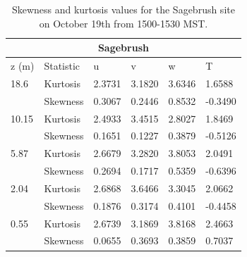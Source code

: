 \documentclass[]{article}
\begin{document}
\begin{table}
\begin{tabular}{ |p{1cm}|p{2cm}|p{1cm}|p{1cm}|p{1cm}| p{1.5cm}|}

		\hline
		\multicolumn{6}{|c|}{Sagebrush} \\
		\hline\hline
		z (m) & Statistic & u &  v & w & T\\
		\hline
		18.6 & Kurtosis & 2.3731 & 3.1820 & 3.6346&  1.6588\\
		&Skewness & 0.3067 & 0.2446 & 0.8532 & -0.3490\\
		\hline
		10.15 & Kurtosis & 2.4933 & 3.4515 & 2.8027 &1.8469 \\
		&Skewness & 0.1651 & 0.1227 & 0.3879& -0.5126\\
        \hline
       	5.87 & Kurtosis & 2.6679 & 3.2820 & 3.8053 &2.0491 \\
       	&Skewness & 0.2694 & 0.1717 & 0.5359 & -0.6396\\
       	\hline
   		2.04 & Kurtosis & \cellcolor{red!25} 2.6868 & 3.6466  & 3.3045 & 2.0662  \\
   		&Skewness & \cellcolor{blue!25} 0.1876 & 0.3174 & 0.4101& -0.4458\\
   		\hline
		0.55 & Kurtosis & \cellcolor{red!25} 2.6739 & 3.1869 & 3.8168  & 2.4663\\
		&Skewness &\cellcolor{blue!25} 0.0655 & 0.3693 & 0.3859&0.7037\\
		\hline
		
\end{tabular}
\label{tab:kurt_sage}
\caption{Skewness and kurtosis values for the Sagebrush site on October 19th from 1500-1530 MST. }
\end{table}
\end{document}
